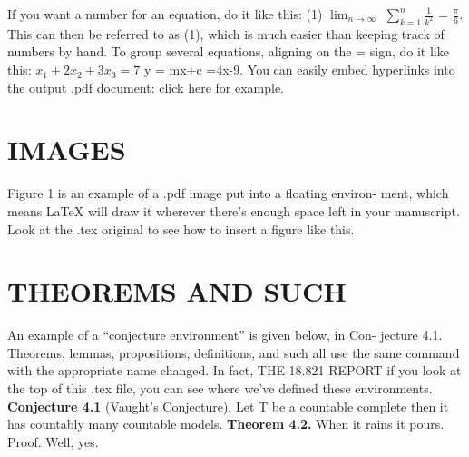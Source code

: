 \documentclass{article}
\begin{document}
           \large{If you want a number for an equation, do it like this: \newline 
           	(1)      $\lim_{n\to\infty}$ $\sum_{k=1}^{n}$$\frac{1}{k^2}$ = $\frac{\pi}{6}$.\newline
           	This can then be referred to as (1), which is much easier than keeping \newline
           	track of numbers by hand. To group several equations, aligning on the \newline
           	= sign, do it like this: \newline
           	 $x_1+2x_2+3x_3 = 7$ \newline
           	          y = mx+c \newline
           	            =4x-9. \newline
           	    You can easily embed hyperlinks into the output .pdf document: \newline
           	            \textcolor{blue}{\url{click here }}for example.
 \section{IMAGES} 
\large{Figure 1 is an example of a .pdf image put into a ﬂoating environ- \newline
 ment, which means LaTeX will draw it wherever there’s enough space 
 left in your manuscript. Look at the .tex original to see how to insert 
 a ﬁgure like this.}
\section{THEOREMS AND SUCH}
\large{An example of a “conjecture environment” is given below, in Con- \newline
jecture 4.1. Theorems, lemmas, propositions, deﬁnitions, and such \newline all 
use the same command with the appropriate name changed. In fact,\newline
       THE 18.821 REPORT \newline
if you look at the top of this .tex ﬁle, you can see where we’ve deﬁned 
these environments.\newline
\textbf{Conjecture 4.1} (Vaught’s Conjecture). Let T be a countable com­plete 
then it has countably many countable models. \newline
\textbf{Theorem 4.2.} When it rains it pours.
Proof. Well, yes.}

}
\end{document}

